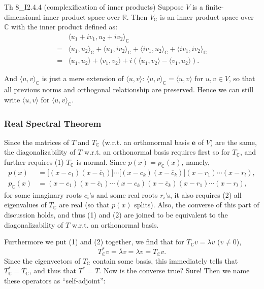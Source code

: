 \documentclass{article}
\begin{document}
\begin{Th}{Th 8\_I2.4.4 (complexification of inner products)}
    Suppose $V$ is a finite-dimensional inner product space over $\mathbb{R}$. Then $V_{\mathbb{C}}$ is an inner product space over $\mathbb{C}$ with the inner product defined as:
    $$ 
    \begin{aligned}
        & \langle u_1+iv_1, u_2+iv_2\rangle _{\mathbb{C}} \\
        =& \langle u_1, u_2\rangle _{\mathbb{C}} + \langle u_1, iv_2\rangle _{\mathbb{C}} + \langle iv_1, u_2\rangle _{\mathbb{C}} + \langle iv_1, iv_2\rangle _{\mathbb{C}} \\
        =& \langle u_1, u_2\rangle + \langle v_1, v_2\rangle + i\left(\langle u_1, v_2\rangle - \langle v_1, u_2\rangle\right).
    \end{aligned}
    $$
\end{Th}

And $\langle u,v \rangle _{\mathbb{C}}$ is just a mere extension of $\langle u,v \rangle$: $\langle u,v \rangle _{\mathbb{C}} = \langle u,v \rangle$ for $u, v\in V$, so that all previous norms and orthogonal relationship are preserved. \textcolor{Df}{Hence we can still write $\langle u,v \rangle$ for $\langle u,v \rangle _{\mathbb{C}}$}.

\subsubsection{Real Spectral Theorem}
Since the matrices of $T$ and $T_{\mathbb{C}}$ (w.r.t. an orthonormal basis $\pmb{e}$ of $V$) are the same, the diagonalizability of $T$ w.r.t. an orthonormal basis requires first so for $T_{\mathbb{C}}$, and further requires (1) $T_{\mathbb{C}}$ is normal. Since $p(x) = p_{\mathbb{C}}(x)$, namely, 
$$ 
\begin{aligned}
    p(x) &= \Big[(x-c_1)(x-\overline{c}_1)\Big]\cdots\Big[(x-c_k)(x-\overline{c}_k)\Big](x-r_1)\cdots(x-r_l), \\
    p_{\mathbb{C}}(x) &= (x-c_1)(x-\overline{c}_1)\cdots(x-c_k)(x-\overline{c}_k)(x-r_1)\cdots(x-r_l),
\end{aligned}
$$
for some imaginary roots $c_i$'s and some real roots $r_i$'s, it also requires (2) all eigenvalues of $T_{\mathbb{C}}$ are real (so that $p(x)$ splits). Also, the converse of this part of discussion holds, and thus (1) and (2) are joined to be equivalent to the diagonalizability of $T$ w.r.t. an orthonormal basis.

Furthermore we put (1) and (2) together, we find that for $T_\mathbb{C}v = \lambda v$ ($v\neq 0$),
$$ T_\mathbb{C}^\ast v = \overline{\lambda} v = \lambda v = T_\mathbb{C}v. $$
Since the eigenvectors of $T_\mathbb{C}$ contain some basis, this immediately tells that $T^\ast_\mathbb{C} = T_\mathbb{C}$, and thus that $T^\ast = T$. Now is the converse true? Sure! Then we name these operators as ``self-adjoint'':
\end{document}
